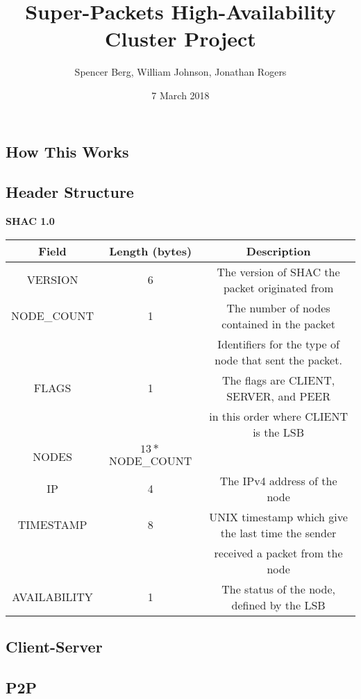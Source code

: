 \documentclass[11pt]{article}
\title{Super-Packets High-Availability Cluster Project}
\author{Spencer Berg, William Johnson, Jonathan Rogers}
\date{7 March 2018}
\begin{document}
\maketitle

\thispagestyle{empty}

\begin{doublespace}
\section{How This Works}

\subsection{Header Structure}
\begin{center}
\textbf{SHAC 1.0}
\begin{tabular}{|c|c|c|}
\hline
Field & Length (bytes) & Description \\
\hline
VERSION & 6 & The version of SHAC the packet originated from \\
\hline
NODE\_COUNT & 1 & The number of nodes contained in the packet \\
\hline
 &  & Identifiers for the type of node that sent the packet.\\
FLAGS & 1 & The flags are CLIENT, SERVER, and PEER \\ 
 & & in this order where CLIENT is the LSB \\
\hline
NODES & $13*$NODE\_COUNT& \\
\hdashline
IP & 4 & The IPv4 address of the node \\
\hdashline
TIMESTAMP & 8 & UNIX timestamp which give the last time the sender\\
& & received a packet from the node \\
\hdashline
AVAILABILITY & 1 & The status of the node, defined by the LSB \\
\hline
\end{tabular}
\end{center}

\subsection{Client-Server}



\subsection{P2P}




\end{doublespace}
\end{document}
